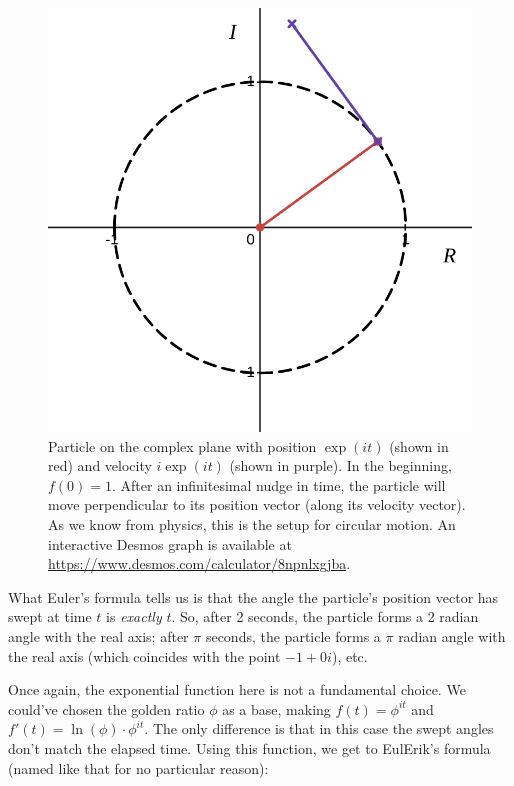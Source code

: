 \begin{figure}[H]
	\centering
	\includegraphics[width=\linewidth]{media/rotation.png}
	\caption{Particle on the complex plane with position $\exp(it)$ (shown in red) and velocity $i\exp(it)$ (shown in purple). In the beginning, $f(0) = 1$. After an infinitesimal nudge in time, the particle will move perpendicular to its position vector (along its velocity vector). As we know from physics, this is the setup for circular motion. An interactive Desmos graph is available at \url{https://www.desmos.com/calculator/8npnlxgjba}.}
	\label{rot}
\end{figure}

What Euler's formula tells us is that the angle the particle's position vector has swept at time $t$ is \textit{exactly} $t$. So, after 2 seconds, the particle forms a 2 radian angle with the real axis; after $\pi$ seconds, the particle forms a $\pi$ radian angle with the real axis (which coincides with the point $-1 + 0i$), etc.

Once again, the exponential function here is not a fundamental choice. We could've chosen the golden ratio $\phi$ as a base, making $f(t) = \phi^{it}$ and $f'(t) = \ln(\phi) \cdot \phi^{it}$. The only difference is that in this case the swept angles don't match the elapsed time. Using this function, we get to EulErik's formula (named like that for no particular reason):

